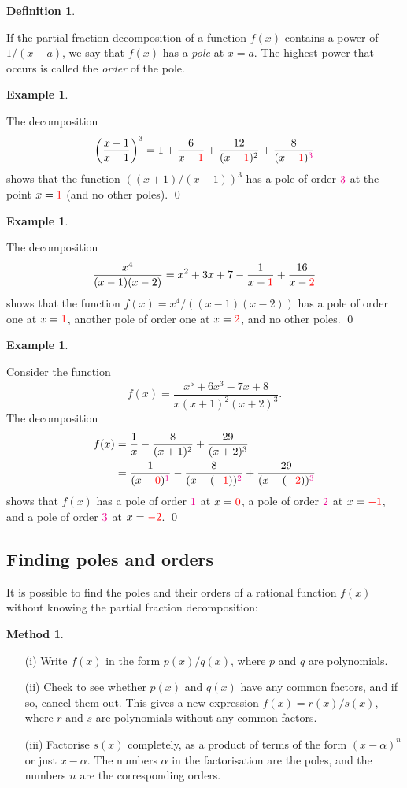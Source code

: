\documentclass[a4paper]{book}
\newcommand{\RED}[1]{{\color{red}#1}}
\newcommand{\PURPLE}[1]{{\color{purple}#1}}
\newcommand{\MAGENTA}[1]{{\color{magenta}#1}}
\newcommand{\al}        {\alpha}
\renewcommand{\:}{\colon}
\newcommand{\bilabel}[1]{\hypertarget{#1}{\label{#1}}}
\newcommand{\DEFN}[1]{\PURPLE{\emph{#1}}}
\theoremstyle{definition}
\newtheorem{definition}[theorem]{Definition}
\newtheorem{example}[theorem]{Example}
\newtheorem{method}[theorem]{Method}
\begin{document}
\begin{definition}\bilabel{defn-pole}
 If the partial fraction decomposition of a function $f(x)$ contains a
 power of $1/(x-a)$, we say that $f(x)$ has a \DEFN{pole} at $x=a$.
 The highest power that occurs is called the \DEFN{order} of the pole.
\end{definition}
\begin{example}\bilabel{eg-poles-i}
 The decomposition
 \[ \left(\frac{x+1}{x-1}\right)^3
    = 1 + \frac{6}{x-\RED{1}} +
      \frac{12}{(x-\RED{1})^2} + \frac{8}{(x-\RED{1})^\MAGENTA{3}}
 \]
 shows that the function $((x+1)/(x-1))^3$ has a pole of order
 $\MAGENTA{3}$ at the point $x=\RED{1}$ (and no other poles). \qed
\end{example}
\begin{example}\bilabel{eg-poles-ii}
 The decomposition
 \[ \frac{x^4}{(x-1)(x-2)}
    = x^2 + 3x + 7 - \frac{1}{x-\RED{1}} + \frac{16}{x-\RED{2}}
 \]
 shows that the function $f(x)=x^4/((x-1)(x-2))$ has a pole of order
 one at $x=\RED{1}$, another pole of order one at $x=\RED{2}$, and no
 other poles. \qed
\end{example}
\begin{example}\bilabel{eg-poles-iii}
 Consider the function
 \[ f(x) = \frac{x^5+6x^3-7x+8}{x(x+1)^2(x+2)^3}. \]
 The decomposition
 \begin{align*}
  f(x) &= \frac{1}{x} - \frac{8}{(x+1)^2} + \frac{29}{(x+2)^3} \\
       &=   \frac{ 1}{(x-\RED{0})^\MAGENTA{1}}
          - \frac{ 8}{(x-(\RED{-1}))^\MAGENTA{2}}
          + \frac{29}{(x-(\RED{-2}))^\MAGENTA{3}}
 \end{align*}
 shows that $f(x)$ has a pole of order $\MAGENTA{1}$ at $x=\RED{0}$,
 a pole of order $\MAGENTA{2}$ at $x=\RED{-1}$, and a pole of order
 $\MAGENTA{3}$ at $x=\RED{-2}$. \qed
\end{example}

\subsection*{Finding poles and orders}

It is possible to find the poles and their orders of a rational
function $f(x)$ without knowing the partial fraction decomposition:
\begin{method}\bilabel{alg-poles}
 \begin{itemize}
  \item[(i)] Write $f(x)$ in the form $p(x)/q(x)$, where $p$ and $q$
   are polynomials.
  \item[(ii)] Check to see whether $p(x)$ and $q(x)$ have any common
   factors, and if so, cancel them out.  This gives a new expression
   $f(x)=r(x)/s(x)$, where $r$ and $s$ are polynomials without any
   common factors.
  \item[(iii)] Factorise $s(x)$ completely, as a product of terms of
   the form $(x-\al)^n$ or just $x-\al$.  The numbers $\al$ in the
   factorisation are the poles, and the numbers $n$ are the
   corresponding orders.
 \end{itemize}
\end{method}
\end{document}
